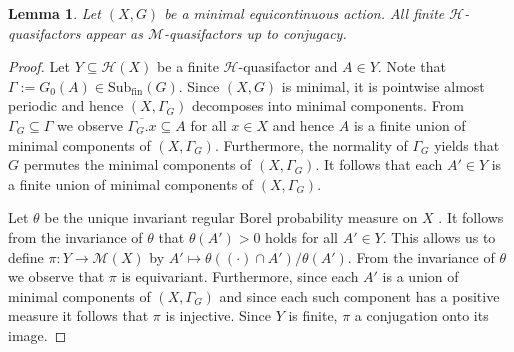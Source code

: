 \documentclass[12pt, reqno]{amsart}
\newtheorem{lemma}[theorem]{Lemma}
\theoremstyle{definition}
\theoremstyle{remark}
\numberwithin{equation}{section}
\theoremstyle{theorem}
\theoremstyle{remark}
\def\subfin{{\operatorname{Sub_{fin}}}}
\def\hyper{{\mathcal{H}}}
\begin{document}
\begin{lemma}
\label{lem:HXMXtranslation}
    Let $(X,G)$ be a minimal equicontinuous action.         
    All finite \linebreak $\hyper$-quasifactors appear as $\mathcal{M}$-quasifactors up to conjugacy. 
\end{lemma}
\begin{proof}
    Let $Y\subseteq \hyper(X)$ be a finite $\hyper$-quasifactor and $A\in Y$.  
    Note that $\Gamma:=G_0(A)\in \subfin(G)$. 
    Since $(X,G)$ is minimal, it is pointwise almost periodic and hence $(X,\Gamma_G)$ decomposes into minimal components. 
    From $\Gamma_G\subseteq \Gamma$ we observe $\overline{\Gamma_G.x}\subseteq A$ for all $x\in X$ and hence $A$ is a finite union of minimal components of $(X,\Gamma_G)$. 
    Furthermore, the normality of $\Gamma_G$ yields that $G$ permutes the minimal components of $(X,\Gamma_G)$.
    It follows that each $A'\in Y$ is a finite union of minimal components of $(X,\Gamma_G)$. 

    Let $\theta$ be the unique invariant regular Borel probability measure on $X$ \cite[Chapter~7]{auslander1988minimal}. 
    It follows from the invariance of $\theta$ that $\theta(A')>0$ holds for all $A'\in Y$. 
    This allows us to define $\pi\colon Y\to \mathcal{M}(X)$ by $A'\mapsto \theta((\cdot)\cap A')/\theta(A')$. 
    From the invariance of $\theta$ we observe that $\pi$ is equivariant. 
    Furthermore, since each $A'$ is a union of minimal components of $(X,\Gamma_G)$ and since each such component has a positive measure it follows that $\pi$ is injective. 
    Since $Y$ is finite, $\pi$ a conjugation onto its image. 
\end{proof}
\end{document}
